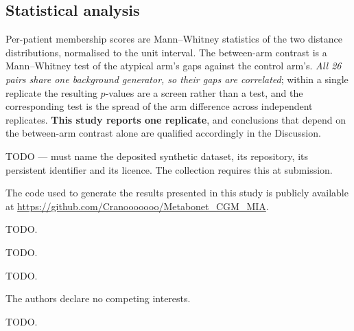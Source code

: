 \documentclass[pdflatex,sn-nature]{sn-jnl}
\theoremstyle{thmstyleone}
\begin{document}
\subsection{Statistical analysis}\label{subsec:stats}
Per-patient membership scores are Mann--Whitney statistics of the two distance
distributions, normalised to the unit interval. The between-arm contrast is a
Mann--Whitney test of the atypical arm's gaps against the control arm's.
\emph{All 26 pairs share one background generator, so their gaps are
correlated}; within a single replicate the resulting $p$-values are a screen
rather than a test, and the corresponding test is the spread of the arm
difference across independent replicates. \textbf{This study reports one
replicate}, and conclusions that depend on the between-arm contrast alone are
qualified accordingly in the Discussion.


\backmatter

TODO --- must name the deposited synthetic dataset, its repository, its
persistent identifier and its licence. The collection requires this at
submission.

The code used to generate the results presented in this study is publicly
available at \url{https://github.com/Cranooooooo/Metabonet_CGM_MIA}.

TODO.

TODO.

TODO.

The authors declare no competing interests.

TODO.


\end{document}
